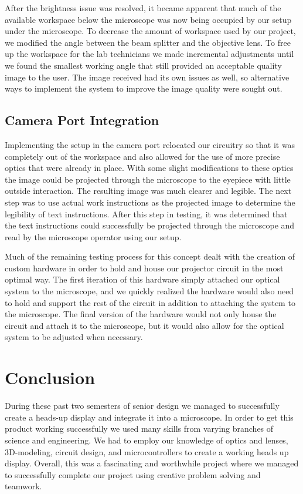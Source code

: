 \documentclass[12pt,a4paper]{article}
\begin{document}
After the brightness issue was resolved, it became apparent that much of the available workspace below the microscope was now being occupied by our setup under the microscope. To decrease the amount of workspace used by our project, we modified the angle between the beam splitter and the objective lens. To free up the workspace for the lab technicians we made incremental adjustments until we found the smallest working angle that still provided an acceptable quality image to the user. The image received had its own issues as well, so alternative ways to implement the system to improve the image quality were sought out. 

\subsection{Camera Port Integration}
Implementing the setup in the camera port relocated our circuitry so that it was completely out of the workspace and also allowed for the use of more precise optics that were already in place. With some slight modifications to these optics the image could be projected through the microscope to the eyepiece with little outside interaction. The resulting image was much clearer and legible. The next step was to use actual work instructions as the projected image to determine the legibility of text instructions. After this step in testing, it was determined that the text instructions could successfully be projected through the microscope and read by the microscope operator using our setup. 

Much of the remaining testing process for this concept dealt with the creation of custom hardware in order to hold and house our projector circuit in the most optimal way. The first iteration of this hardware simply attached our optical system to the microscope, and we quickly realized the hardware would also need to hold and support the rest of the circuit in addition to attaching the system to the microscope. The final version of the hardware would not only house the circuit and attach it to the microscope, but it would also allow for the optical system to be adjusted when necessary.

\section{Conclusion}

During these past two semesters of senior design we managed to successfully create a heads-up display and integrate it into a microscope. In order to get this product working successfully we
used many skills from varying branches of science and engineering. We had to employ our knowledge of optics and lenses, 3D-modeling, circuit design, and microcontrollers to create a working heads up display. Overall, this was a fascinating and worthwhile project where we managed to successfully complete our project using creative problem solving and teamwork.
\end{document}
